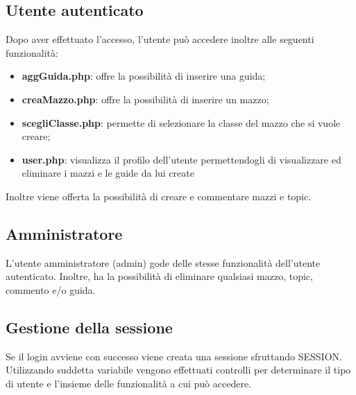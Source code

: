 \subsection{Utente autenticato}
Dopo aver effettuato l'accesso, l'utente può accedere inoltre alle seguenti funzionalità:
\begin{itemize}
	\item  \textbf{aggGuida.php}: offre la possibilità di inserire una guida;
	\item \textbf{creaMazzo.php}: offre la possibilità di inserire un mazzo;
	\item \textbf{scegliClasse.php}: permette di selezionare la classe del mazzo che si vuole creare;
	\item \textbf{user.php}: visualizza il profilo dell'utente permettendogli di visualizzare ed eliminare i mazzi e le guide da lui create
\end{itemize}
Inoltre viene offerta la possibilità di creare e commentare mazzi e topic.
\subsection{Amministratore}
L'utente amministratore (admin) gode delle stesse funzionalità dell'utente autenticato. Inoltre, ha la possibilità di eliminare qualsiasi mazzo, topic, commento e/o guida.
\subsection{Gestione della sessione}
Se il login avviene con successo viene creata una sessione sfruttando \textdollar \textunderscore SESSION. Utilizzando suddetta variabile vengono effettuati controlli per determinare il tipo di utente e l'insieme delle funzionalità a cui può accedere.

\newpage
